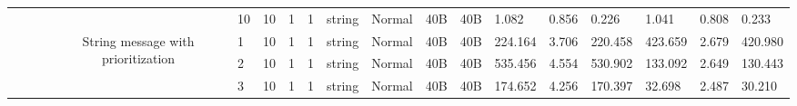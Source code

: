 \begin{landscape}
\begin{table}[]
{\begin{tabular}{@{}ccccllllllllllllll@{}}
                                                                                   &                              &                                &                                                                                                          & 10                                                    & 10                                       & 1                                          & 1                                 & string                           & Normal                             & 40B                                           & 40B                                             & 1.082                   & 0.856    & 0.226                        & 1.041                   & 0.808    & 0.233                        \\
                                                                                   &                              &                                & \multirow{10}{*}{String message with prioritization}                                                     & 1                                                     & 10                                       & 1                                          & 1                                 & string                           & Normal                             & 40B                                           & 40B                                             & 224.164                 & 3.706    & 220.458                      & 423.659                 & 2.679    & 420.980                      \\
                                                                                   &                              &                                &                                                                                                          & 2                                                     & 10                                       & 1                                          & 1                                 & string                           & Normal                             & 40B                                           & 40B                                             & 535.456                 & 4.554    & 530.902                      & 133.092                 & 2.649    & 130.443                      \\
                                                                                   &                              &                                &                                                                                                          & 3                                                     & 10                                       & 1                                          & 1                                 & string                           & Normal                             & 40B                                           & 40B                                             & 174.652                 & 4.256    & 170.397                      & 32.698                  & 2.487    & 30.210                       \\

\end{tabular}}
\end{table}
\end{landscape}
